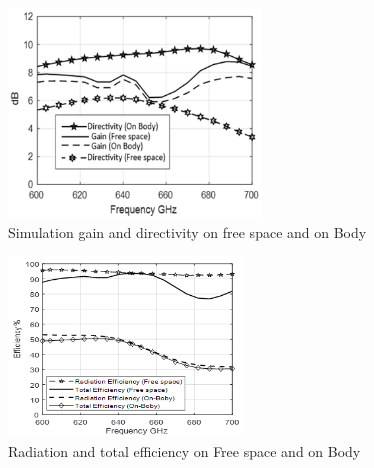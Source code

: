 \documentclass[12pt]{suhbook}
\begin{document}
\begin{figure}[hbt!]
    \centering
    \includegraphics[width=0.6\textwidth]{11}
    \caption{Simulation gain and directivity on free space and on Body}
    \label{Fig 8AA}
\end{figure}
\begin{figure}[hbt!]
    \centering
    \includegraphics[width=0.55\textwidth]{12}
    \caption{Radiation and total efficiency on Free space and on Body}
    \label{Fig 91}
\end{figure}
\end{document}
